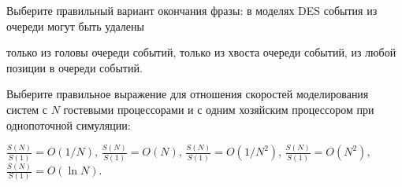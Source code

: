 \begin{questions}
\question[3] Выберите правильный вариант окончания фразы: в моделях DES события из очереди могут быть удалены
\begin{choices}
    \choice только из головы очереди событий,
    \choice только из хвоста очереди событий,
    \correctchoice из любой позиции в очереди событий.
\end{choices}

\question[3] Выберите правильное выражение для отношения скоростей моделирования систем с $N$ гостевыми процессорами и с одним хозяйским процессором при однопоточной симуляции:
\begin{choices}
    \correctchoice $\frac{S(N)}{S(1)} = O(1/N)$,
    \choice $\frac{S(N)}{S(1)} = O(N)$,
    \choice $\frac{S(N)}{S(1)} = O(1/N^2)$,
    \choice $\frac{S(N)}{S(1)} = O(N^2)$,
    \choice $\frac{S(N)}{S(1)} = O(\ln{}N)$.
\end{choices}


\end{questions}

% 
% 
% 
% 
% 
% 
% 
%         
% 


 
 